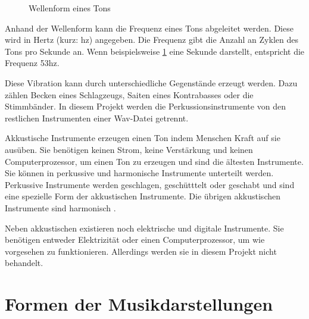 \begin{figure}[h]
    \centering
    \caption{Wellenform eines Tons}
    \label{wav_sound}
\end{figure}
\par

Anhand der Wellenform kann die Frequenz eines Tons abgeleitet werden. Diese wird in Hertz (kurz: hz) angegeben. Die Frequenz gibt die Anzahl an Zyklen des Tons pro Sekunde an. Wenn beispielsweise \cref{wav_sound} eine Sekunde darstellt, entspricht die Frequenz 53hz.

Diese Vibration kann durch unterschiedliche Gegenstände erzeugt werden. Dazu zählen Becken eines Schlagzeugs, Saiten eines Kontrabasses oder die Stimmbänder. In diesem Projekt werden die Perkussionsinstrumente von den restlichen Instrumenten einer Wav-Datei getrennt. 

\par

Akkustische Instrumente erzeugen einen Ton indem Menschen Kraft auf sie ausüben. Sie benötigen keinen Strom, keine Verstärkung und keinen Computerprozessor, um einen Ton zu erzeugen und sind die ältesten Instrumente. Sie können in perkussive und harmonische Instrumente unterteilt werden. Perkussive Instrumente werden geschlagen, geschütttelt oder geschabt und sind eine spezielle Form der akkustischen Instrumente. Die übrigen akkustischen Instrumente sind harmonisch \parencite{acoustic_electric_digital_instruments}.

\par

Neben akkustischen existieren noch elektrische und digitale Instrumente. Sie benötigen entweder Elektrizität oder einen Computerprozessor, um wie vorgesehen zu funktionieren. Allerdings werden sie in diesem Projekt nicht behandelt.

%
\section{Formen der Musikdarstellungen}
%

